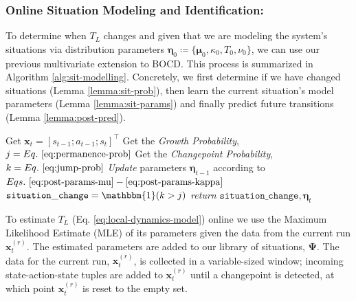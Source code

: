\documentclass[Afour,sageh,times]{sagej}
\theoremstyle{lemma}
\begin{document}
\subsubsection{Online Situation Modeling and Identification:} \label{sec:sit-modeling-and-id}

To determine when $T_L$ changes and given that we are modeling the system's situations via distribution parameters $\boldsymbol{\eta}_0 \coloneqq \{\boldsymbol{\mu}_0, \kappa_0, T_0, \nu_0\}$, we can use our previous multivariate extension to BOCD. This process is summarized in Algorithm \ref{alg:sit-modelling}. Concretely, we first determine if we have changed situations (Lemma \ref{lemma:sit-prob}), then learn the current situation's model parameters (Lemma \ref{lemma:sit-params}) and finally predict future transitions (Lemma \ref{lemma:post-pred}).


\begin{algorithm}[H]
    {\small \caption{Online Situation Modeling $\mathtt{(SM)}$}\label{alg:sit-modelling}
    \begin{algorithmic}[1]
    \State Get $\boldsymbol{x}_t = [s_{t-1}; a_{t-1}; s_{t}]^\top$
    \State Get the \textit{Growth Probability}, $j = Eq.~\eqref{eq:permanence-prob}$
    \State Get the \textit{Changepoint Probability}, $k = Eq.~\eqref{eq:jump-prob}$
    \State \textit{Update} parameters $\boldsymbol{\eta}_{t-1}$ according to $Eqs.~\eqref{eq:post-params-mu}-\eqref{eq:post-params-kappa}$
    \State $\mathtt{situation\_change} = \mathbbm{1}(k > j)$
    \State \textit{return} $\mathtt{situation\_change}, \boldsymbol{\eta}_t$
    \end{algorithmic}
    }
\end{algorithm}

To estimate $T_L$ (Eq. \ref{eq:local-dynamics-model}) online we use the Maximum Likelihood Estimate (MLE) of its parameters given the data from the current run $\boldsymbol{x}^{(r)}_t$. The estimated parameters are added to our library of situations, $\boldsymbol{\Psi}$. The data for the current run, $\boldsymbol{x}^{(r)}_t$, is collected in a variable-sized window; incoming state-action-state tuples are added to $\boldsymbol{x}^{(r)}_t$ until a changepoint is detected, at which point $\boldsymbol{x}^{(r)}_t$ is reset to the empty set.
\end{document}
